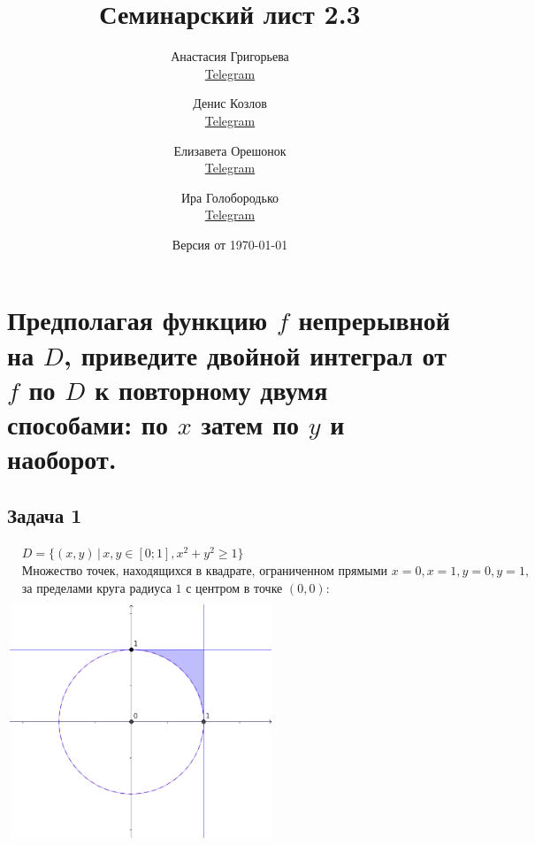 \documentclass[a4paper, fleqn]{article}
\title{Семинарский лист 2.3}
\author{
    Анастасия Григорьева \\ \href{https://t.me/weifoll}{Telegram} \and
    Денис Козлов         \\ \href{https://t.me/DKozl50}{Telegram} \and
    Елизавета Орешонок   \\ \href{https://t.me/eaoresh}{Telegram} \and
    Ира Голобородько     \\ \href{https://t.me/Ira4kgl}{Telegram}
}
\date{Версия от {\ddmmyyyydate\today} \currenttime}
\begin{document}
    \maketitle
    
    \section*{Предполагая функцию $f$ непрерывной на $D$, приведите двойной интеграл от $f$ по $D$ к повторному 
    двумя способами: по $x$ затем по $y$ и наоборот.}
    \subsection*{Задача 1\\[-40 pt]}
    \begin{align*}
        & D = \{ (x, y) \,|\, x, y \in [0; 1], x^2 + y^2 \ge 1 \} \\[3 pt]
        & \text{Множество точек, находящихся в квадрате, ограниченном прямыми $x = 0, x = 1, y = 0, y = 1$,} \\
        & \text{за пределами круга радиуса 1 с центром в точке $(0, 0)$:} \\[3 pt]
    \end{align*}
        \includegraphics[width=8cm, height=7cm]{task 1.png}\\
\end{document}
